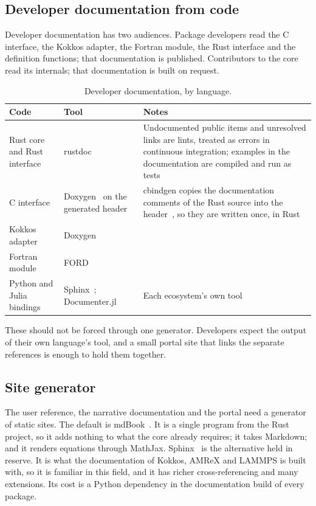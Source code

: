 \documentclass[11pt,a4paper]{article}
\begin{document}
\subsection{Developer documentation from code}

Developer documentation has two audiences.  Package developers read the C
interface, the Kokkos adapter, the Fortran module, the Rust interface and
the definition functions; that documentation is published.  Contributors to
the core read its internals; that documentation is built on request.

\begin{table}[ht]
\centering
\small
\begin{tabularx}{\textwidth}{@{}>{\raggedright\arraybackslash}p{36mm} >{\raggedright\arraybackslash}p{34mm} L@{}}
\toprule
Code & Tool & Notes \\
\midrule
Rust core and Rust interface & rustdoc~\cite{rustdoc} & Undocumented public items and unresolved links are lints, treated as errors in continuous integration; examples in the documentation are compiled and run as tests \\
C interface & Doxygen~\cite{doxygen} on the generated header & cbindgen copies the documentation comments of the Rust source into the header~\cite{cbindgen}, so they are written once, in Rust \\
Kokkos adapter & Doxygen & \\
Fortran module & FORD~\cite{ford} & \\
Python and Julia bindings & Sphinx~\cite{sphinx}; Documenter.jl~\cite{documenter} & Each ecosystem's own tool \\
\bottomrule
\end{tabularx}
\caption{Developer documentation, by language.}
\label{tab:devdocs}
\end{table}

These should not be forced through one generator.  Developers expect the
output of their own language's tool, and a small portal site that links the
separate references is enough to hold them together.

\subsection{Site generator}

The user reference, the narrative documentation and the portal need a
generator of static sites.  The default is mdBook~\cite{mdbook}.  It is a
single program from the Rust project, so it adds nothing to what the core
already requires; it takes Markdown; and it renders equations through
MathJax.  Sphinx~\cite{sphinx} is the alternative held in reserve.  It is
what the documentation of Kokkos, AMReX and LAMMPS is built with, so it is
familiar in this field, and it has richer cross-referencing and many
extensions.  Its cost is a Python dependency in the documentation build of
every package.
\end{document}
